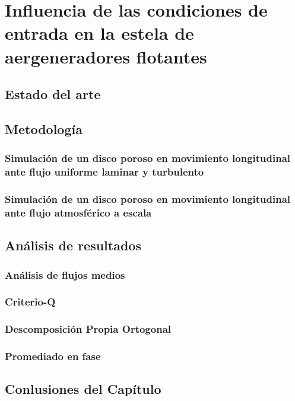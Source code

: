 \chapter{Influencia de las condiciones de entrada en la estela de aergeneradores flotantes}

\section{Estado del arte}

\section{Metodología}

\subsection{Simulación de un disco poroso en movimiento longitudinal ante flujo uniforme laminar y turbulento}

\subsection{Simulación de un disco poroso en movimiento longitudinal ante flujo atmosférico a escala}

\section{Análisis de resultados}

\subsection{Análisis de flujos medios}
\subsection{Criterio-Q}
\subsection{Descomposición Propia Ortogonal}
\subsection{Promediado en fase}

\section{Conlusiones del Capítulo}